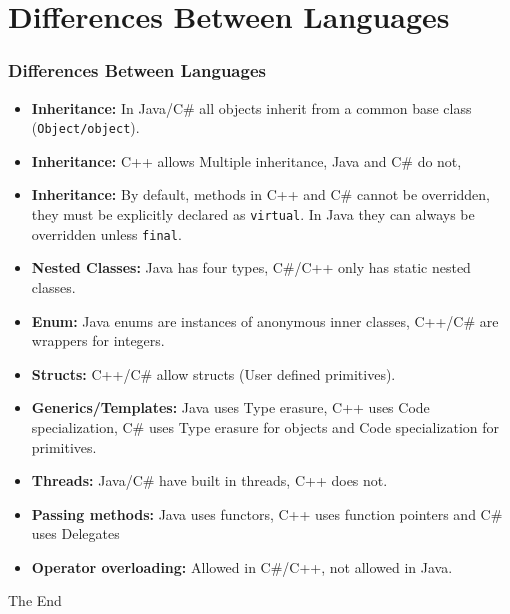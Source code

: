 \documentclass{beamer}
\begin{document}
\section{Differences Between Languages}
\begin{frame}
\frametitle{Differences Between Languages}
\scriptsize
\begin{itemize}
\item \textbf{Inheritance:} In Java/C\# all objects inherit from a common base class (\texttt{Object/object}).
\item \textbf{Inheritance:} C++ allows {\color{red} Multiple inheritance}, Java and C\# do not,
\item \textbf{Inheritance:} By default, methods in C++ and C\# cannot be overridden, they must be explicitly declared as \texttt{\color{green}virtual}. In Java they can always be overridden unless \texttt{final}.
\item \textbf{Nested Classes:} Java has four types, C\#/C++ only has static nested classes.
\item \textbf{Enum:} Java enums are instances of anonymous inner classes, C++/C\# are wrappers for integers.
\item \textbf{Structs:} C++/C\# allow structs (User defined primitives).
\item \textbf{Generics/Templates:} Java uses {\color{orange} Type erasure}, C++ uses {\color{magenta} Code specialization}, C\# uses {\color{orange} Type erasure} for objects and {\color{magenta} Code specialization} for primitives.
\item \textbf{Threads:} Java/C\# have built in threads, C++ does not.
\item \textbf{Passing methods:} Java uses functors, C++ uses function pointers and C\# uses Delegates
\item \textbf{Operator overloading:} Allowed in C\#/C++, not allowed in Java.
\end{itemize}
\end{frame}
\begin{frame}
\Huge{\centerline{The End}}
\end{frame}

\end{document}
